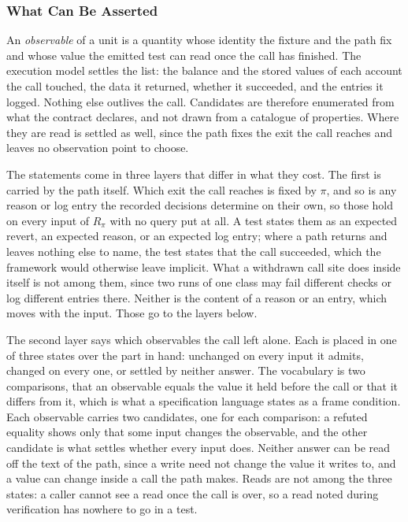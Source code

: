 \documentclass[manuscript,anonymous]{acmart}
\begin{document}
\subsubsection{What Can Be Asserted}
An \emph{observable} of a unit is a quantity whose identity the fixture and the
path fix and whose value the emitted test can read once the call has finished.
The execution model settles the list: the balance and the stored values of each
account the call touched, the data it returned, whether it succeeded, and the
entries it logged. Nothing else outlives the call. Candidates are therefore
enumerated from what the contract declares, and not drawn from a catalogue of
properties. Where they are read is settled as well, since the path fixes the
exit the call reaches and leaves no observation point to choose.

The statements come in three layers that differ in what they cost. The first is
carried by the path itself. Which exit the call reaches is fixed by $\pi$, and
so is any reason or log entry the recorded decisions determine on their own, so
those hold on every input of $R_\pi$ with no query put at all. A test states
them as an expected revert, an expected reason, or an expected log entry; where
a path returns and leaves nothing else to name, the test states that the call
succeeded, which the framework would otherwise leave implicit. What
a withdrawn call site does inside itself is not among them, since two runs of
one class may fail different checks or log different entries there. Neither is
the content of a reason or an entry, which moves with the input. Those go to
the layers below.

The second layer says which observables the call left alone. Each is placed in
one of three states over the part in hand: unchanged on every input it admits,
changed on every one, or settled by neither answer. The vocabulary is two
comparisons, that an observable equals the value it held before the call or
that it differs from it, which is what a specification language states as a
frame condition. Each observable carries two candidates, one for each
comparison: a refuted equality shows only that some input changes the
observable, and the other candidate is what settles whether every input does.
Neither answer can be read off the text of the path, since a write need not
change the value it writes to, and a value can change inside a call the path
makes. Reads are not among the three states: a caller cannot see a read once
the call is over, so a read noted during verification has nowhere to go in a
test.
\end{document}
